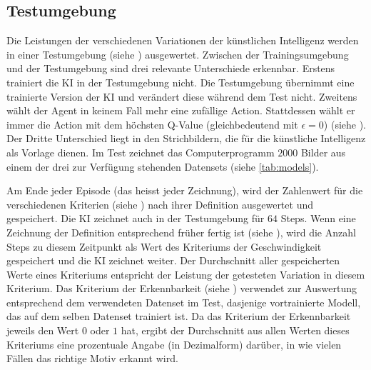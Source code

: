 \subsection{Testumgebung}\label{sub:m_auswert_test}
Die Leistungen der verschiedenen Variationen der künstlichen Intelligenz werden
in einer Testumgebung (siehe ) ausgewertet. Zwischen der
Trainingsumgebung und der Testumgebung sind drei relevante Unterschiede
erkennbar. Erstens trainiert die KI in der Testumgebung nicht. Die Testumgebung
übernimmt eine trainierte Version der KI und verändert diese während dem Test
nicht. Zweitens wählt der Agent in keinem Fall mehr eine zufällige Action.
Stattdessen wählt er immer die Action mit dem höchsten Q-Value (gleichbedeutend
mit $\epsilon = 0$) (siehe ). Der Dritte Unterschied
liegt in den Strichbildern, die für die künstliche Intelligenz als Vorlage
dienen. Im Test zeichnet das Computerprogramm $2000$ Bilder aus einem der drei
zur Verfügung stehenden Datensets (siehe \autoref{tab:models}). 

Am Ende jeder Episode (das heisst jeder Zeichnung), wird der Zahlenwert für die
verschiedenen Kriterien (siehe ) nach ihrer Definition
ausgewertet und gespeichert. Die KI zeichnet auch in der Testumgebung für $64$
Steps. Wenn eine Zeichnung der Definition entsprechend früher fertig ist (siehe
), wird die Anzahl Steps zu diesem Zeitpunkt als Wert
des Kriteriums der Geschwindigkeit gespeichert und die KI zeichnet weiter. Der
Durchschnitt aller gespeicherten Werte eines Kriteriums entspricht der Leistung
der getesteten Variation in diesem Kriterium. Das Kriterium der Erkennbarkeit
(siehe ) verwendet zur Auswertung entsprechend dem
verwendeten Datenset im Test, dasjenige vortrainierte Modell, das auf dem selben
Datenset trainiert ist. Da das Kriterium der Erkennbarkeit jeweils den Wert $0$
oder $1$ hat, ergibt der Durchschnitt aus allen Werten dieses Kriteriums eine
prozentuale Angabe (in Dezimalform) darüber, in wie vielen Fällen das richtige
Motiv erkannt wird.



